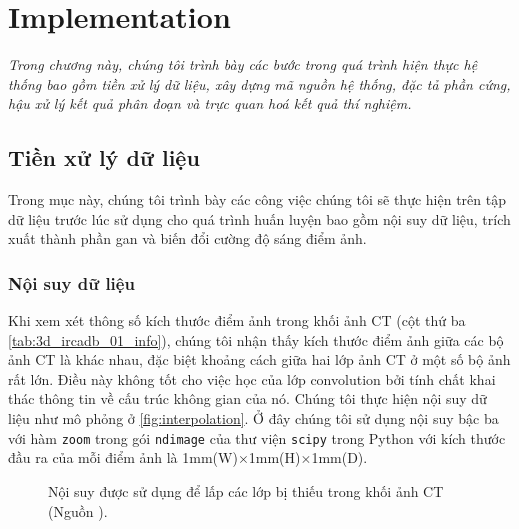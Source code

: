 \chapter{Implementation}
\label{chap:hien_thuc_he_thong}
	\textit{Trong chương này, chúng tôi trình bày các bước trong quá trình hiện thực hệ thống bao gồm tiền xử lý dữ liệu, xây dựng mã nguồn hệ thống, đặc tả phần cứng, hậu xử lý kết quả phân đoạn và trực quan hoá kết quả thí nghiệm.}
\minitoc

\section{Tiền xử lý dữ liệu} 
\label{sec:tien_xu_ly_du_lieu}
	Trong mục này, chúng tôi trình bày các công việc chúng tôi sẽ thực hiện trên tập dữ liệu trước lúc sử dụng cho quá trình huấn luyện bao gồm nội suy dữ liệu, trích xuất thành phần gan và biến đổi cường độ sáng điểm ảnh.

\subsection{Nội suy dữ liệu} 
\label{subsec:noi_suy_du_lieu}
	Khi xem xét thông số kích thước điểm ảnh trong khối ảnh CT (cột thứ ba \autoref{tab:3d_ircadb_01_info}), chúng tôi nhận thấy kích thước điểm ảnh giữa các bộ ảnh CT là khác nhau, đặc biệt khoảng cách giữa hai lớp ảnh CT ở một số bộ ảnh rất lớn. Điều này không tốt cho việc học của lớp convolution bởi tính chất khai thác thông tin về cấu trúc không gian của nó. Chúng tôi thực hiện nội suy dữ liệu như mô phỏng ở \autoref{fig:interpolation}. Ở đây chúng tôi sử dụng nội suy bậc ba với hàm \verb/zoom/ trong gói \verb/ndimage/ của thư viện \verb/scipy/ trong Python với kích thước đầu ra của mỗi điểm ảnh là 1mm(W)$\times$1mm(H)$\times$1mm(D).
	\begin{figure}[h!]
		\centering
		
		\caption[Nội suy được sử dụng để lấp các lớp bị thiếu trong khối ảnh CT.]{Nội suy được sử dụng để lấp các lớp bị thiếu trong khối ảnh CT (Nguồn \cite{sach2017interpolation}).}
		\label{fig:interpolation}
	\end{figure}

